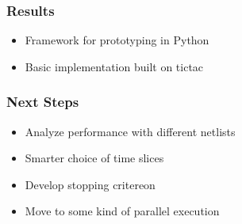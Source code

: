 \begin{frame}
\frametitle{Results}
\begin{itemize}[<+->]
    \item Framework for prototyping in Python
    \item Basic implementation built on tictac
\end{itemize}
\end{frame}

\begin{frame}
\frametitle{Next Steps}
\begin{itemize}[<+->]
    \item Analyze performance with different netlists
    \item Smarter choice of time slices
    \item Develop stopping critereon
    \item Move to some kind of parallel execution
\end{itemize}
\end{frame}
